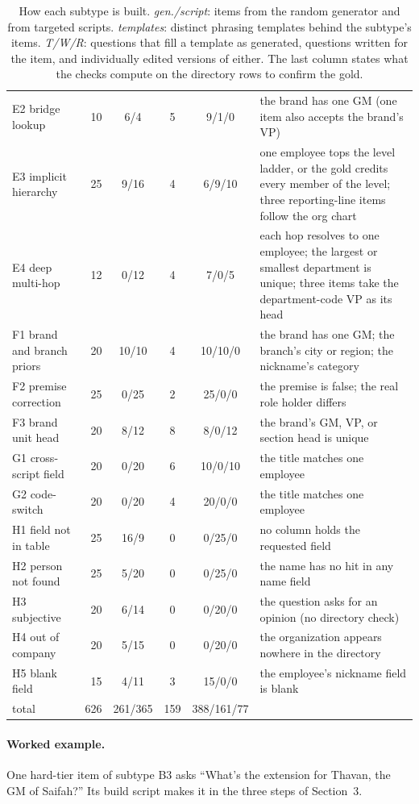 \documentclass[11pt]{article}
\begin{document}
\begin{table}[t]
\begin{tabular}{@{}lrccc>{\raggedright\arraybackslash}p{5.5cm}@{}}
E2 bridge lookup & 10 & 6/4 & 5 & 9/1/0 & the brand has one GM (one item also accepts the brand's VP) \\
E3 implicit hierarchy & 25 & 9/16 & 4 & 6/9/10 & one employee tops the level ladder, or the gold credits every member of the level; three reporting-line items follow the org chart \\
E4 deep multi-hop & 12 & 0/12 & 4 & 7/0/5 & each hop resolves to one employee; the largest or smallest department is unique; three items take the department-code VP as its head \\
F1 brand and branch priors & 20 & 10/10 & 4 & 10/10/0 & the brand has one GM; the branch's city or region; the nickname's category \\
F2 premise correction & 25 & 0/25 & 2 & 25/0/0 & the premise is false; the real role holder differs \\
F3 brand unit head & 20 & 8/12 & 8 & 8/0/12 & the brand's GM, VP, or section head is unique \\
G1 cross-script field & 20 & 0/20 & 6 & 10/0/10 & the title matches one employee \\
G2 code-switch & 20 & 0/20 & 4 & 20/0/0 & the title matches one employee \\
H1 field not in table & 25 & 16/9 & 0 & 0/25/0 & no column holds the requested field \\
H2 person not found & 25 & 5/20 & 0 & 0/25/0 & the name has no hit in any name field \\
H3 subjective & 20 & 6/14 & 0 & 0/20/0 & the question asks for an opinion (no directory check) \\
H4 out of company & 20 & 5/15 & 0 & 0/20/0 & the organization appears nowhere in the directory \\
H5 blank field & 15 & 4/11 & 3 & 15/0/0 & the employee's nickname field is blank \\
\midrule
total & 626 & 261/365 & 159 & 388/161/77 & \
\bottomrule
\end{tabular}
\caption{How each subtype is built. \emph{gen./script}: items from the random generator and from
targeted scripts. \emph{templates}: distinct phrasing templates behind the subtype's items. \emph{T/W/R}:
questions that fill a template as generated, questions written for the item, and individually edited versions of either. The last column states what the checks compute on the directory rows to confirm the gold.}
\label{tab:construction}
\end{table}

\paragraph{Worked example.} One hard-tier item of subtype B3 asks ``What's the extension for Thavan, the
GM of Saifah?'' Its build script makes it in the three steps of Section~3.
\end{document}
